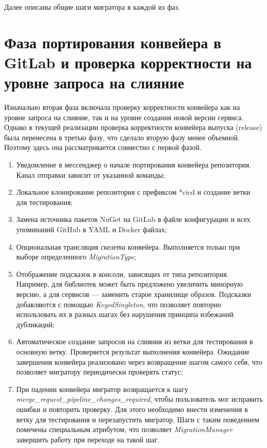 Далее описаны общие шаги мигратора в каждой из фаз.

\section{Фаза портирования конвейера в GitLab и проверка корректности на уровне запроса на слияние}
Изначально вторая фаза включала проверку корректности конвейера как на уровне запроса на слияние, так и на уровне создания новой версии сервиса. Однако в текущей реализации проверка корректности конвейера выпуска (release) была перенесена в третью фазу, что сделало вторую фазу менее объемной. Поэтому здесь она рассматривается совместно с первой фазой.

\begin{enumerate}
  \item Уведомление в мессенджер о начале портирования конвейера репозитория. Канал отправки зависит от указанной команды;
  \item Локальное клонирование репозитория с префиксом *cicd и создание ветки для тестирования;
  \item Замена источника пакетов NuGet \cite{nuget} на GitLab в файле конфигурации и всех упоминаний GitHub в YAML и Docker файлах;
  \item Опциональная трансляция \emph{скелета} конвейера. Выполняется только при выборе определенного \emph{MigrationType};
  \item Отображение подсказок в консоли, зависящих от типа репозитория. Например, для библиотек может быть предложено увеличить минорную версию, а для сервисов — заменить старое хранилище образов. Подсказки добавляются с помощью \emph{KeyedSingleton}, что позволяет повторно использовать их в разных шагах без нарушения принципа избежаний дубликаций;
  \item Автоматическое создание запросов на слияния из ветки для тестирования в основную ветку. Проверяется результат выполнения конвейера. Ожидание завершения конвейера реализовано через возвращение шагом самого себя, что позволяет мигратору периодически проверять статус;
  \item При падении конвейера мигратор возвращается к шагу \emph{merge\_request\_pipeline\_changes\_required}, чтобы пользователь мог исправить ошибки и повторить проверку. Для этого необходимо внести изменения в ветку для тестирования и перезапустить мигратор. Шаги с таким поведением помечены специальным атрибутом, что позволяет \emph{MigrationManager} завершить работу при переходе на такой шаг.
\end{enumerate}


